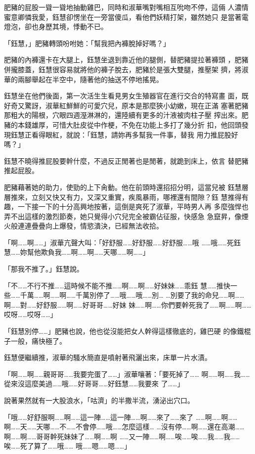 肥豬的屁股一聳一聳地抽動雞巴，同時和淑華嘴對嘴相互吮吻不停，這倆
人濃情蜜意卿憐我愛，鈺慧卻愣坐在一旁當傻瓜，看他們妖精打架，雖然她只
是當著電燈泡，卻也身歷其境，悸動不已。

「鈺慧，」肥豬轉頭吩咐她：「幫我把內褲脫掉好嗎？」

肥豬的內褲還卡在大腿上，鈺慧坐退到靠近他的腿側，替肥豬提拉著褲頭
，肥豬併攏膝蓋，鈺慧很容易就將他的褲子脫去，肥豬於是張大雙腿，推壓架
擠，將淑華的兩腳舉起在半空中，隨著他的抽送不停地搖晃。

鈺慧坐在他們後面，第一次活生生看見男女生殖器官在進行交合的特寫畫
面，既好奇又驚訝，淑華紅鮮鮮的可愛穴兒，原本是那麼狹小幼嫩，現在正滿
塞著肥豬那粗大的陽根，穴眼四週溼淋淋的，還陸續有更多的汁液被肉柱子壓
搾出來。肥豬的本錢雄厚，可惜大肚皮從中作梗，不免在功能上多打了幾分折
扣，他回頭發現鈺慧正看得眼紅，就說：「鈺慧，請妳再多幫我一件事，替我
用力推屁股好嗎？」

鈺慧不曉得推屁股要幹什麼，不過反正閒著也是閒著，就跪到床上，依言
替肥豬推起屁股。

肥豬藉著她的助力，使勁的上下肏動。他在前頭時還招招分明，這當兒被
鈺慧層層推來，立刻又快又有力，又深又重實，疾風暴雨，哪裡還有間隙？鈺
慧推得有趣，一下接一下的十分高興地按著，這倒是爽死了淑華，平時男人再
多麼強悍也弄不出這樣的激烈節奏，她只覺得小穴兒完全被霸佔征服，快感急
急竄昇，像煙火般連連疊疊向上爆發，情慾潰決，已經無法收拾。

「啊……啊……」淑華亢聲大叫：「好舒服……好舒服……好舒服……哦
……哦……死鈺慧……妳幫他欺負我……啊……啊……天哪……啊……」

「那我不推了。」鈺慧說。

「不……不行不推……這時候不能不推……啊……啊……好妹妹……乖鈺
慧……推快一些……千萬……啊……啊……千萬別停了……哦……哦……別…
…別要了我的命兒……啊……啊……對……好舒服……啊……好哥哥……好妹
妹……啊……你們要幹死我了……啊……啊……哎呀……哎呀……」

「鈺慧別停……」肥豬也說，他也從沒能把女人幹得這樣徹底的，雞巴硬
的像鐵棍子一般，痛快極了。

鈺慧便繼續推，淑華的騷水簡直是噴射著飛灑出來，床單一片水漬。

「啊……啊……親哥哥……我要完蛋了……」淑華嚷著：「要死掉了……
啊……啊……我……從來沒這麼美過……哦……好哥哥……好鈺慧……我要來
了……」

說著果然就有一大股浪水，「咕濟」的半撒半流，湧泌出穴口。

「哦……好舒服啊……啊……這一陣……這一陣……啊……來了……來了
……啊……啊……啊……天……天哪……不……不會停……哦……怎麼這樣…
…沒有停……啊……還在高潮……啊……啊……哥哥幹死妹妹了……啊……啊
……又一陣……啊……唉……唉……我……我……唉……死了算了……哦……
哦……嗯……嗯……」

